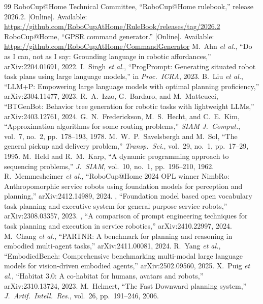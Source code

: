 \documentclass[conference]{IEEEtran}
\newcommand{\todo}[1]{}
\newcommand{\todo}[1]{\textcolor{red}{[TODO: #1]}}
\begin{document}
\begin{thebibliography}{99}
 RoboCup@Home Technical Committee, ``RoboCup@Home rulebook,'' release 2026.2. [Online]. Available: \url{https://github.com/RoboCupAtHome/RuleBook/releases/tag/2026.2}
 RoboCup@Home, ``GPSR command generator.'' [Online]. Available: \url{https://github.com/RoboCupAtHome/CommandGenerator}
 M.~Ahn \emph{et al.}, ``Do as I can, not as I say: Grounding language in robotic affordances,'' arXiv:2204.01691, 2022.
 I.~Singh \emph{et al.}, ``ProgPrompt: Generating situated robot task plans using large language models,'' in \emph{Proc.\ ICRA}, 2023.
 B.~Liu \emph{et al.}, ``LLM+P: Empowering large language models with optimal planning proficiency,'' arXiv:2304.11477, 2023.
 R.~A.~Izzo, G.~Bardaro, and M.~Matteucci, ``BTGenBot: Behavior tree generation for robotic tasks with lightweight LLMs,'' arXiv:2403.12761, 2024.
 G.~N.~Frederickson, M.~S.~Hecht, and C.~E.~Kim, ``Approximation algorithms for some routing problems,'' \emph{SIAM J.\ Comput.}, vol.~7, no.~2, pp.~178--193, 1978.
 M.~W.~P.~Savelsbergh and M.~Sol, ``The general pickup and delivery problem,'' \emph{Transp.\ Sci.}, vol.~29, no.~1, pp.~17--29, 1995.
 M.~Held and R.~M.~Karp, ``A dynamic programming approach to sequencing problems,'' \emph{J.\ SIAM}, vol.~10, no.~1, pp.~196--210, 1962.
 R.~Memmesheimer \emph{et al.}, ``RoboCup@Home 2024 OPL winner NimbRo: Anthropomorphic service robots using foundation models for perception and planning,'' arXiv:2412.14989, 2024.
 \todo{authors}, ``Foundation model based open vocabulary task planning and executive system for general purpose service robots,'' arXiv:2308.03357, 2023.
 \todo{authors}, ``A comparison of prompt engineering techniques for task planning and execution in service robotics,'' arXiv:2410.22997, 2024.
 M.~Chang \emph{et al.}, ``PARTNR: A benchmark for planning and reasoning in embodied multi-agent tasks,'' arXiv:2411.00081, 2024.
 R.~Yang \emph{et al.}, ``EmbodiedBench: Comprehensive benchmarking multi-modal large language models for vision-driven embodied agents,'' arXiv:2502.09560, 2025.
 X.~Puig \emph{et al.}, ``Habitat 3.0: A co-habitat for humans, avatars and robots,'' arXiv:2310.13724, 2023.
 M.~Helmert, ``The Fast Downward planning system,'' \emph{J.\ Artif.\ Intell.\ Res.}, vol.~26, pp.~191--246, 2006.
\end{thebibliography}
\end{document}
